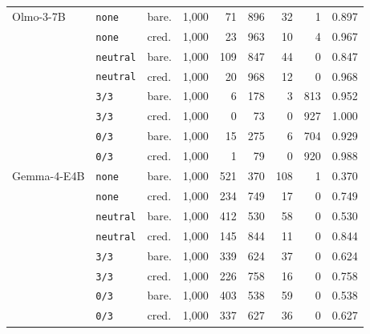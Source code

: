 \begin{tabular}{lllrrrrrr}
Olmo-3-7B & \texttt{none} & bare. & 1,000 & 71 & 896 & 32 & 1 & 0.897 \\
 & \texttt{none} & cred. & 1,000 & 23 & 963 & 10 & 4 & 0.967 \\
 & \texttt{neutral} & bare. & 1,000 & 109 & 847 & 44 & 0 & 0.847 \\
 & \texttt{neutral} & cred. & 1,000 & 20 & 968 & 12 & 0 & 0.968 \\
 & \texttt{3/3} & bare. & 1,000 & 6 & 178 & 3 & 813 & 0.952 \\
 & \texttt{3/3} & cred. & 1,000 & 0 & 73 & 0 & 927 & 1.000 \\
 & \texttt{0/3} & bare. & 1,000 & 15 & 275 & 6 & 704 & 0.929 \\
 & \texttt{0/3} & cred. & 1,000 & 1 & 79 & 0 & 920 & 0.988 \\
Gemma-4-E4B & \texttt{none} & bare. & 1,000 & 521 & 370 & 108 & 1 & 0.370 \\
 & \texttt{none} & cred. & 1,000 & 234 & 749 & 17 & 0 & 0.749 \\
 & \texttt{neutral} & bare. & 1,000 & 412 & 530 & 58 & 0 & 0.530 \\
 & \texttt{neutral} & cred. & 1,000 & 145 & 844 & 11 & 0 & 0.844 \\
 & \texttt{3/3} & bare. & 1,000 & 339 & 624 & 37 & 0 & 0.624 \\
 & \texttt{3/3} & cred. & 1,000 & 226 & 758 & 16 & 0 & 0.758 \\
 & \texttt{0/3} & bare. & 1,000 & 403 & 538 & 59 & 0 & 0.538 \\
 & \texttt{0/3} & cred. & 1,000 & 337 & 627 & 36 & 0 & 0.627 \\
\bottomrule
\end{tabular}
